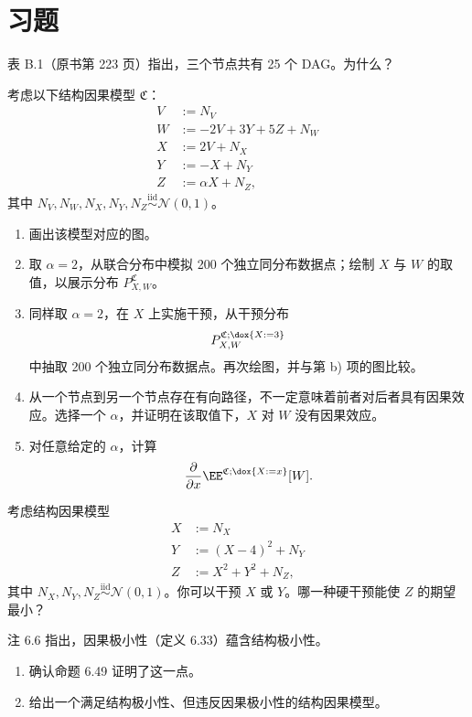 \section{习题}
\label{sec:ch06-problems}
\setcounter{problem}{53}

\begin{problem}[DAG]
表 B.1（原书第 223 页）指出，三个节点共有 25 个 DAG。为什么？
\end{problem}

\begin{problem}[多元结构因果模型]
考虑以下结构因果模型 $\mathfrak C$：
\[
 \begin{aligned}
 V&:=N_V\\
 W&:=-2V+3Y+5Z+N_W\\
 X&:=2V+N_X\\
 Y&:=-X+N_Y\\
 Z&:=\alpha X+N_Z,
 \end{aligned}
\]
其中 $N_V,N_W,N_X,N_Y,N_Z\overset{\mathrm{iid}}{\sim}\mathcal N(0,1)$。
\begin{enumerate}[label=\alph*)]
 \item 画出该模型对应的图。
 \item 取 $\alpha=2$，从联合分布中模拟 200 个独立同分布数据点；绘制 $X$ 与 $W$ 的取值，以展示分布 $P_{X,W}^{\mathfrak C}$。
 \item 同样取 $\alpha=2$，在 $X$ 上实施干预，从干预分布
 \[
 P_{X,W}^{\mathfrak C;\dox{X:=3}}
 \]
 中抽取 200 个独立同分布数据点。再次绘图，并与第 b) 项的图比较。
 \item 从一个节点到另一个节点存在有向路径，不一定意味着前者对后者具有因果效应。选择一个 $\alpha$，并证明在该取值下，$X$ 对 $W$ 没有因果效应。
 \item 对任意给定的 $\alpha$，计算
 \[
 \frac{\partial}{\partial x}\EE^{\mathfrak C;\dox{X:=x}}[W].
 \]
\end{enumerate}
\end{problem}

\begin{problem}[干预]
考虑结构因果模型
\[
 \begin{aligned}
 X&:=N_X\\
 Y&:=(X-4)^2+N_Y\\
 Z&:=X^2+Y^2+N_Z,
 \end{aligned}
\]
其中 $N_X,N_Y,N_Z\overset{\mathrm{iid}}{\sim}\mathcal N(0,1)$。你可以干预 $X$ 或 $Y$。哪一种硬干预能使 $Z$ 的期望最小？
\end{problem}

\begin{problem}[极小性]
注 6.6 指出，因果极小性（定义 6.33）蕴含结构极小性。
\begin{enumerate}[label=\alph*)]
 \item 确认命题 6.49 证明了这一点。
 \item 给出一个满足结构极小性、但违反因果极小性的结构因果模型。
\end{enumerate}
\end{problem}

